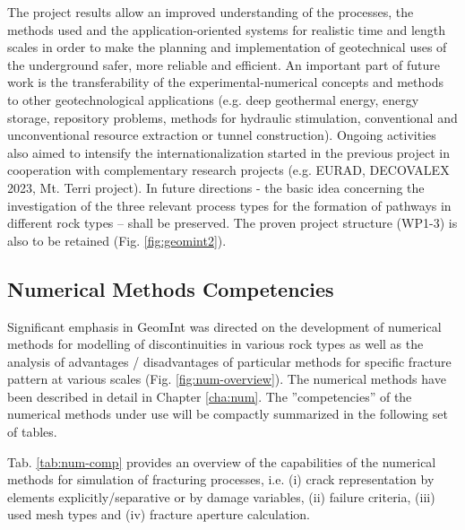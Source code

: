 The project results allow an improved understanding of the processes, the methods used and the application-oriented systems for realistic time and length scales in order to make the planning and implementation of geotechnical uses of the underground safer, more reliable and efficient. An important part of future work is the transferability of the experimental-numerical concepts and methods to other geotechnological applications (e.g. deep geothermal energy, energy storage, repository problems, methods for hydraulic stimulation, conventional and unconventional resource extraction or tunnel construction). Ongoing activities also aimed to intensify the internationalization started in the previous project in cooperation with complementary research projects (e.g. EURAD, DECOVALEX 2023, Mt. Terri project).
%
In future directions - the basic idea concerning the investigation of the three relevant process types for the formation of pathways in different rock types -- shall be preserved. The proven project structure (WP1-3) is also to be retained (Fig. \ref{fig:geomint2}).

\subsection{Numerical Methods Competencies}
\label{sec:synthesis-num}

Significant emphasis in GeomInt was directed on the development of numerical methods for modelling of discontinuities in various rock types as well as the analysis of advantages / disadvantages of particular methods for specific fracture pattern at various scales (Fig. \ref{fig:num-overview}). The numerical methods have been described in detail in Chapter \ref{cha:num}. The ''competencies'' of the numerical methods under use will be compactly summarized in the following set of tables.

Tab. \ref{tab:num-comp} provides an overview of the capabilities of the numerical methods for simulation of fracturing processes, i.e. (i) crack representation by elements explicitly/separative or by damage variables, (ii) failure criteria, (iii) used mesh types and (iv) fracture aperture calculation.

